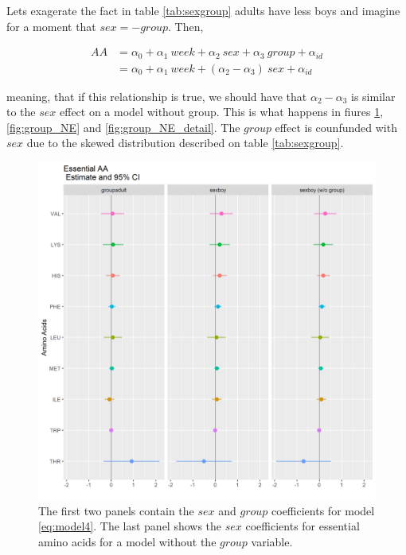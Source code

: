 \documentclass[12pt]{article}
\begin{document}
Lets exagerate the fact in table \ref{tab:sexgroup} adults have less boys and imagine for a moment that $sex = -group$. Then,

\begin{align}
AA &= \alpha_0 + \alpha_1 \ week + \alpha_2 \ sex + \alpha_3 \ group + \alpha_{id} \label{eq:model4} \\
   &= \alpha_0 + \alpha_1 \ week + \left(\alpha_2 - \alpha_3 \right) \ sex + \alpha_{id} \nonumber
\end{align}

meaning, that if this relationship is true, we should have that $\alpha_2 - \alpha_3$ is similar to the $sex$ effect on a model without group. This is what happens in fiures
\ref{fig:group_E}, \ref{fig:group_NE} and \ref{fig:group_NE_detail}. The $group$ effect is counfunded with $sex$ due to the skewed distribution described on table \ref{tab:sexgroup}.


\begin{figure}[!htb]
  \centering
  \includegraphics[width=\textwidth]{../wANDhc/group_E.png}
  \caption{The first two panels contain the $sex$ and $group$ coefficients for model \ref{eq:model4}. The last panel shows the $sex$ coefficients for essential amino acids for a model without the $group$ variable.}
  \label{fig:group_E}
\end{figure}
\end{document}
